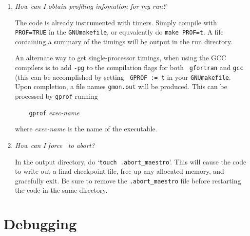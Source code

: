 \begin{enumerate}
\item {\em How can I obtain profiling infomation for my run?}

  The code is already instrumented with timers.  Simply compile with
  {\tt PROF=TRUE} in the {\tt GNUmakefile}, or equvalently do 
  {\tt make PROF=t}.  A file containing a summary of the timings will
  be output in the run directory.

  An alternate way to get single-processor timings, when using the GCC
  compilers is to add {\tt -pg} to the compilation flags for both {\tt
    gfortran} and {\tt gcc} (this can be accomplished by setting {\tt
    GPROF := t} in your {\tt GNUmakefile}.  Upon completion, a file
  names {\tt gmon.out} will be produced.  This can be processed by
  {\tt gprof} running

  {\tt~~~ gprof} {\em exec-name}
  
  where {\em exec-name} is the name of the executable.

\item{\em How can I force \maestro\ to abort?}

  In the output directory, do `{\tt touch .abort\_maestro}'.  This 
  will cause the code to write out a final checkpoint file, free up
  any allocated memory, and gracefully exit.  Be sure to remove the 
  {\tt .abort\_maestro} file before restarting the code in the 
  same directory.



\end{enumerate}


\section{Debugging}


